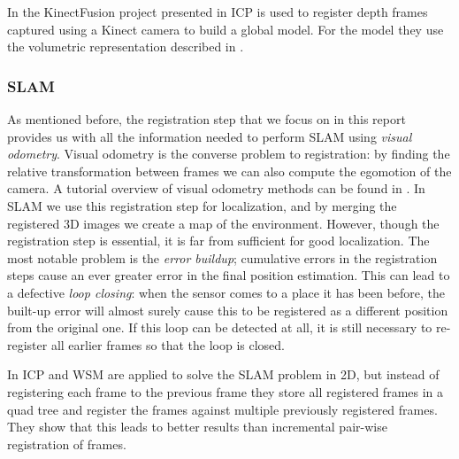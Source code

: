 \documentclass[a4paper]{article}
\begin{document}
In the KinectFusion project presented in \cite{izadi2011kinectfusion,newcombe2011kinectfusion} \ac{ICP} is used to register depth frames captured using a Kinect camera to build a global model. For the model they use the volumetric representation described in \cite{curless1996volumetric}. 

\cite{henry2010rgb}

\subsubsection{\acf{SLAM}}


As mentioned before, the registration step that we focus on in this report provides us with all the information needed to perform \ac{SLAM} using \emph{visual odometry}. Visual odometry is the converse problem to registration: by finding the relative transformation between frames we can also compute the egomotion of the camera. A tutorial overview of visual odometry methods can be found in \cite{scaramuzzavisual,fraundorfervisual}. In \ac{SLAM} we use this registration step for localization, and by merging the registered 3D images we create a map of the environment. However, though the registration step is essential, it is far from sufficient for good localization. The most notable problem is the \emph{error buildup}; cumulative errors in the registration steps cause an ever greater error in the final position estimation. This can lead to a defective \emph{loop closing}: when the sensor comes to a place it has been before, the built-up error will almost surely cause this to be registered as a different position from the original one. If this loop can be detected at all, it is still necessary to re-register all earlier frames so that the loop is closed. 


In \cite{slamet2008boosting} \ac{ICP} and \ac{WSM} are applied to solve the \ac{SLAM} problem in 2D, but instead of registering each frame to the previous frame they store all registered frames in a quad tree and register the frames against multiple previously registered frames. They show that this leads to better results than incremental pair-wise registration of frames.
\end{document}
